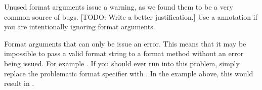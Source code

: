 Unused format arguments issue a warning, as we found them to be a very common source of bugs.
[TODO: Write a better justification.]
Use a  annotation if you are intentionally ignoring format arguments.

Format arguments that can only be  issue an error. This means that it
may be impossible to pass a valid format string to a format method without an
error being issued. For example . 
If you should ever run into this problem, simply replace the problematic format 
specifier with . In the example above, this would result in
.


% 
% 
% 
% 
